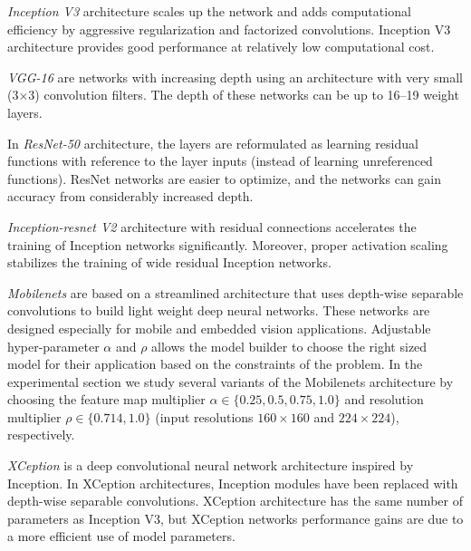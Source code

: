 \documentclass[conference]{IEEEtran}
\begin{document}
\textit{Inception V3} \cite{inceptionv3} architecture scales up the network and adds computational efficiency by aggressive regularization and factorized convolutions. Inception V3 architecture provides good performance at relatively low computational cost.

\textit{VGG-16} \cite{vgg} are networks with increasing depth using an architecture with very small (3$\times$3) convolution filters. The depth of these networks can be up to 16--19 weight layers.

In \textit{ResNet-50} \cite{resnet} architecture, the layers are reformulated as learning residual functions with reference to the layer inputs (instead of learning unreferenced functions). ResNet networks are easier to optimize, and the networks can gain accuracy from considerably increased depth.

\textit{Inception-resnet V2} \cite{inc-resnet} architecture with residual connections accelerates the training of Inception networks significantly. Moreover, proper activation scaling stabilizes the training of wide residual Inception networks.

\textit{Mobilenets} \cite{mobilenets} are based on a streamlined architecture that uses depth-wise separable convolutions to build light weight deep neural networks. These networks are designed especially for mobile and embedded vision applications. Adjustable hyper-parameter $\alpha$ and $\rho$ allows the model builder to choose the right sized model for their application based on the constraints of the problem.
In the experimental section we study several variants of the Mobilenets architecture by choosing the feature map multiplier $\alpha \in \{0.25, 0.5, 0.75, 1.0\}$ and resolution multiplier $\rho \in \{0.714, 1.0\}$ (input resolutions $160\times 160$ and $224\times 224$), respectively.

\textit{XCeption} \cite{xception} is a deep convolutional neural network architecture inspired by Inception. In XCeption architectures, Inception modules have been replaced with depth-wise separable convolutions. XCeption architecture has the same number of parameters as Inception V3, but XCeption networks performance gains are due to a more efficient use of model parameters.
\end{document}
